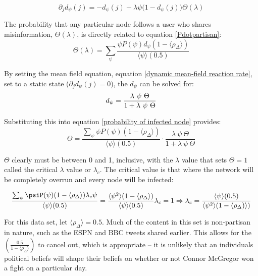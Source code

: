 \documentclass[preprint,review,12pt]{elsarticle}
\begin{document}
\begin{equation}
\label{dynamic mean-field reaction rate}
    \partial_jd_{\psi}(j) = - d_{\psi}(j) + \lambda \psi \big(1 - d_{\psi}(j)\big)\Theta(\lambda)
\end{equation}

The probability that any particular node follows a user who shares misinformation, $\Theta(\lambda)$, is directly related to equation \ref{Pdotpartisan}:
\begin{equation}
\label{probability of infected node}
    \Theta(\lambda) = \sum_{\psi} \frac{\psi P(\psi)d_{\psi}(1-\langle\rho_{\Delta}\rangle)}{\langle \psi \rangle (0.5)}
\end{equation}

By setting the mean field equation, equation \ref{dynamic mean-field reaction rate}, set to a static state ($\partial_jd_{\psi}(j) = 0$), the $d_{\psi}$ can be solved for:
\begin{equation}
\label{static d_{\psi}}
    d_{\psi} = \frac{\lambda \ \psi \ \Theta}{1 + \lambda \ \psi \ \Theta}
\end{equation}

Substituting this into equation \ref{probability of infected node} provides:
\begin{equation}
    \Theta =  \frac{\sum_{\psi} \psi P(\psi)(1-\langle\rho_{\Delta}\rangle)}{\langle \psi \rangle(0.5)}\cdot \frac{\lambda \ \psi \ \Theta}{1 + \lambda \ \psi \ \Theta}
\end{equation}

$\Theta$ clearly must be between 0 and 1, inclusive, with the $\lambda$ value that sets $\Theta = 1$ called the critical $\lambda$ value or $\lambda_c$. The critical value is that where the network will be completely overrun and every node will be infected: 

\begin{equation}
\label{critical value equation}
    \frac{\sum_{\psi} \psiP(\psi)(1-\langle\rho_{\Delta}\rangle)\lambda_c\psi}{\langle \psi \rangle(0.5)} = \frac{\langle \psi^2 \rangle(1-\langle\rho_{\Delta}\rangle)}{\langle \psi \rangle(0.5)}\lambda_c = 1 \Rightarrow \lambda_c = \frac{\langle \psi \rangle(0.5)}{\langle \psi^2 \rangle(1-\langle\rho_{\Delta})\rangle)}
\end{equation}

For this data set, let $\langle \rho_{\Delta} \rangle = 0.5$. Much of the content in this set is non-partisan in nature, such as the ESPN and BBC tweets shared earlier. This allows for the $\left(\frac{0.5}{1-\langle\rho_{\Delta}\rangle}\right)$ to cancel out, which is appropriate -- it is unlikely that an individuals political beliefs will shape their beliefs on whether or not Connor McGregor won a fight on a particular day. 
\end{document}
